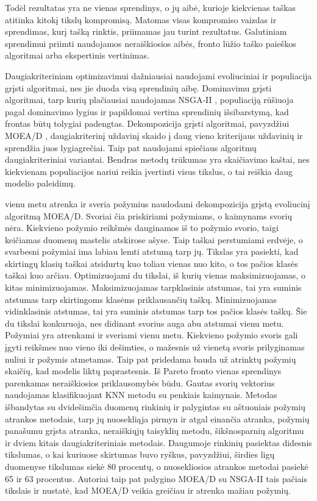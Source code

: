 \documentclass[]{VUMIFTemplateClass}
\begin{document}
    Todėl rezultatas yra ne vienas sprendinys, o jų aibė, kurioje kiekvienas taškas atitinka kitokį tikslų kompromisą.
    Matomas visas kompromiso vaizdas ir sprendimas, kurį tašką rinktis, priimamas jau turint rezultatus.
    Galutiniam sprendimui priimti naudojamos neraiškiosios aibės, fronto lūžio taško paieškos algoritmai arba ekspertinis vertinimas.

    Daugiakriteriniam optimizavimui dažniausiai naudojami evoliuciniai ir populiacija grįsti algoritmai, nes jie duoda visą sprendinių aibę.
    Dominavimu grįsti algoritmai, tarp kurių plačiausiai naudojamas NSGA-II \cite{deb2002}, populiaciją rūšiuoja pagal dominavimo lygius ir papildomai vertina sprendinių išsibarstymą, kad frontas būtų tolygiai padengtas.
    Dekompozicija grįsti algoritmai, pavyzdžiui MOEA/D \cite{zhangli2007}, daugiakriterinį uždavinį skaido į daug vieno kriterijaus uždavinių ir sprendžia juos lygiagrečiai.
    Taip pat naudojami spiečiaus algoritmų daugiakriteriniai variantai.
    Bendras metodų trūkumas yra skaičiavimo kaštai, nes kiekvienam populiacijos nariui reikia įvertinti visus tikslus, o tai reiškia daug modelio paleidimų.

    \cite{paul2015} vienu metu atrenka ir sveria požymius naudodami dekompozicija grįstą evoliucinį algoritmą MOEA/D.
    Svoriai čia priskiriami požymiams, o kaimynams svorių nėra.
    Kiekvieno požymio reikšmės dauginamos iš to požymio svorio, taigi keičiamas duomenų mastelis atskirose ašyse.
    Taip taškai perstumiami erdvėje, o svarbesni požymiai ima labiau lemti atstumą tarp jų.
    Tikslas yra pasiekti, kad skirtingų klasių taškai atsidurtų kuo toliau vienas nuo kito, o tos pačios klasės taškai kuo arčiau.
    Optimizuojami du tikslai, iš kurių vienas maksimizuojamas, o kitas minimizuojamas.
    Maksimizuojamas tarpklasinis atstumas, tai yra suminis atstumas tarp skirtingoms klasėms priklausančių taškų.
    Minimizuojamas vidinklasinis atstumas, tai yra suminis atstumas tarp tos pačios klasės taškų.
    Šie du tikslai konkuruoja, nes didinant svorius auga abu atstumai vienu metu.
    Požymiai yra atrenkami ir sveriami vienu metu.
    Kiekvieno požymio svoris gali įgyti reikšmes nuo vieno iki dešimties, o mažesnis už vienetą svoris prilyginamas nuliui ir požymis atmetamas.
    Taip pat pridedama bauda už atrinktų požymių skaičių, kad modelis liktų paprastesnis.
    Iš Pareto fronto vienas sprendinys parenkamas neraiškiosios priklausomybės būdu.
    Gautas svorių vektorius naudojamas klasifikuojant KNN metodu su penkiais kaimynais.
    Metodas išbandytas su dvidešimčia duomenų rinkinių ir palygintas su aštuoniais požymių atrankos metodais, tarp jų nuosekliąja pirmyn ir atgal einančia atranka, požymių panašumu grįsta atranka, neraiškiųjų taisyklių metodu, šikšnosparnių algoritmu ir dviem kitais daugiakriteriniais metodais.
    Daugumoje rinkinių pasiektas didesnis tikslumas, o kai kuriuose skirtumas buvo ryškus, pavyzdžiui, širdies ligų duomenyse tikslumas siekė 80 procentų, o nuosekliosios atrankos metodai pasiekė 65 ir 63 procentus.
    Autoriai taip pat palygino MOEA/D su NSGA-II tais pačiais tikslais ir nustatė, kad MOEA/D veikia greičiau ir atrenka mažiau požymių.
\end{document}
